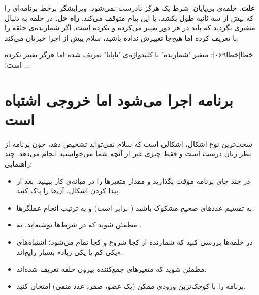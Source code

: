 \textbf{علت.} حلقه‌ی بی‌پایان: شرط یک  هرگز نادرست نمی‌شود.
ویرایشگر برخط برنامه‌ای را که بیش از سه ثانیه طول بکشد، با این پیام متوقف
می‌کند.
\textbf{راه حل.} در حلقه به دنبال متغیری بگردید که باید در هر دور تغییر
می‌کرده و نکرده است. اگر شمارنده‌ی حلقه را با  تعریف کرده اما
هیچ‌جا تغییرش نداده باشید، سلام پیش از اجرا خبرتان می‌کند:

\begin{progoutfa}
خطا[خطا۰۶۹]: متغیر 'شمارنده' با کلیدواژه‌ی 'ناپایا' تعریف شده اما هرگز تغییر نکرده است؛ ...
\end{progoutfa}

\section*{برنامه اجرا می‌شود اما خروجی اشتباه است}

سخت‌ترین نوع اشکال، اشکالی است که سلام نمی‌تواند تشخیص دهد، چون برنامه
از نظر زبان درست است و فقط چیزی غیر از آنچه شما می‌خواستید انجام می‌دهد.
چند راهنمایی:
\begin{itemize}
  \item در چند جای برنامه  موقت بگذارید و مقدار متغیرها را در
        میانه‌ی کار ببینید. بعد از پیدا کردن اشکال، آن‌ها را پاک کنید.
  \item به تقسیم عددهای صحیح مشکوک باشید ( برابر 
        است) و به ترتیب انجام عملگرها.
  \item مطمئن شوید که در شرط‌ها  نوشته‌اید، نه \code{=}.
  \item در حلقه‌ها بررسی کنید که شمارنده از کجا شروع و کجا تمام می‌شود؛
        اشتباه‌های «یکی کم یا یکی زیاد» بسیار رایج‌اند.
  \item مطمئن شوید که متغیرهای جمع‌کننده بیرون حلقه تعریف شده‌اند.
  \item برنامه را با کوچک‌ترین ورودی ممکن (یک عضو، صفر، عدد منفی)
        امتحان کنید.
\end{itemize}
